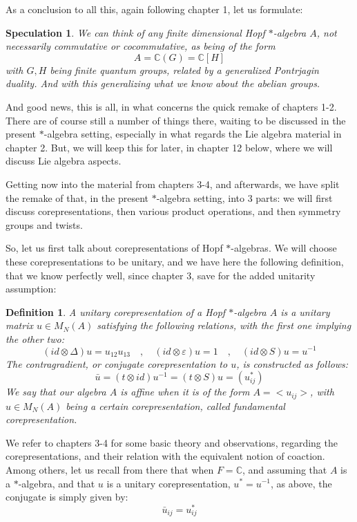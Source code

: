 \documentclass[12pt]{amsbook}
\newtheorem{definition}[theorem]{Definition}
\newtheorem{speculation}[theorem]{Speculation}
\begin{document}
As a conclusion to all this, again following chapter 1, let us formulate:

\begin{speculation}
We can think of any finite dimensional Hopf $*$-algebra $A$, not necessarily commutative or cocommutative, as being of the form
$$A=\mathbb C(G)=\mathbb C[H]$$
with $G,H$ being finite quantum groups, related by a generalized Pontrjagin duality. And with this generalizing what we know about the abelian groups.
\end{speculation}

And good news, this is all, in what concerns the quick remake of chapters 1-2. There are of course still a number of things there, waiting to be discussed in the present $*$-algebra setting, especially in what regards the Lie algebra material in chapter 2. But, we will keep this for later, in chapter 12 below, where we will discuss Lie algebra aspects.

\bigskip

Getting now into the material from chapters 3-4, and afterwards, we have split the remake of that, in the present $*$-algebra setting, into 3 parts: we will first discuss corepresentations, then various product operations, and then symmetry groups and twists. 

\bigskip

So, let us first talk about corepresentations of Hopf $*$-algebras. We will choose these corepresentations to be unitary, and we have here the following definition, that we know perfectly well, since chapter 3, save for the added unitarity assumption:

\begin{definition}
A unitary corepresentation of a Hopf $*$-algebra $A$ is a unitary matrix $u\in M_N(A)$ satisfying the following relations, with the first one implying the other two:
$$(id\otimes\Delta)u=u_{12}u_{13}\quad,\quad (id\otimes \varepsilon)u=1\quad,\quad (id\otimes S)u=u^{-1}$$
The contragradient, or conjugate corepresentation to $u$, is constructed as follows:
$$\bar{u}=(t\otimes id)u^{-1}=(t\otimes S)u=(u_{ij}^*)$$
We say that our algebra $A$ is affine when it is of the form $A=<u_{ij}>$, with $u\in M_N(A)$ being a certain corepresentation, called fundamental corepresentation.
\end{definition}

We refer to chapters 3-4 for some basic theory and observations, regarding the corepresentations, and their relation with the equivalent notion of coaction. Among others, let us recall from there that when $F=\mathbb C$, and assuming that $A$ is a $*$-algebra, and that $u$ is a unitary corepresentation, $u^*=u^{-1}$, as above, the conjugate is simply given by:
$$\bar{u}_{ij}=u_{ij}^*$$
\end{document}
